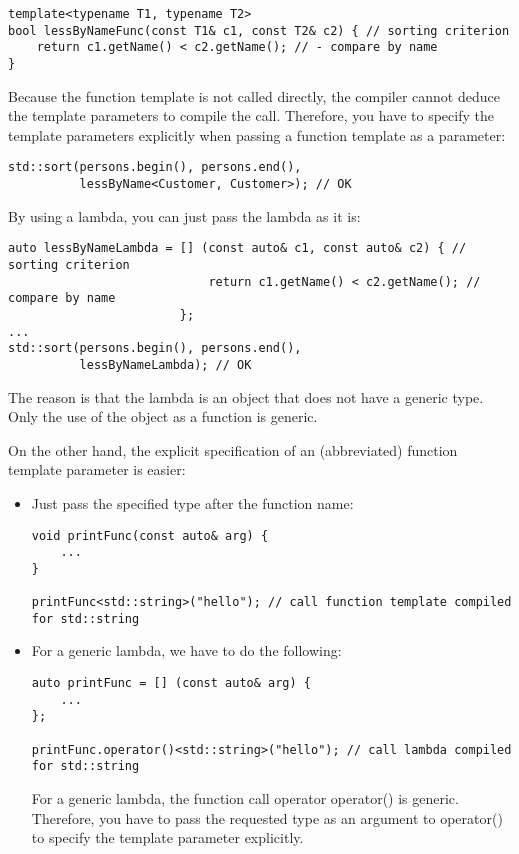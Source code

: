 \begin{lstlisting}[style=styleCXX]
template<typename T1, typename T2>
bool lessByNameFunc(const T1& c1, const T2& c2) { // sorting criterion
	return c1.getName() < c2.getName(); // - compare by name
}
\end{lstlisting}

Because the function template is not called directly, the compiler cannot deduce the template parameters to compile the call. Therefore, you have to specify the template parameters explicitly when passing a function template as a parameter:

\begin{lstlisting}[style=styleCXX]
std::sort(persons.begin(), persons.end(),
		  lessByName<Customer, Customer>); // OK
\end{lstlisting}

By using a lambda, you can just pass the lambda as it is:

\begin{lstlisting}[style=styleCXX]
auto lessByNameLambda = [] (const auto& c1, const auto& c2) { // sorting criterion
							return c1.getName() < c2.getName(); // compare by name
						};
...
std::sort(persons.begin(), persons.end(),
		  lessByNameLambda); // OK
\end{lstlisting}

The reason is that the lambda is an object that does not have a generic type. Only the use of the object as a function is generic.

On the other hand, the explicit specification of an (abbreviated) function template parameter is easier:

\begin{itemize}
\item
Just pass the specified type after the function name:

\begin{lstlisting}[style=styleCXX]
void printFunc(const auto& arg) {
	...
}

printFunc<std::string>("hello"); // call function template compiled for std::string
\end{lstlisting}

\item
For a generic lambda, we have to do the following:

\begin{lstlisting}[style=styleCXX]
auto printFunc = [] (const auto& arg) {
	...
};

printFunc.operator()<std::string>("hello"); // call lambda compiled for std::string
\end{lstlisting}

For a generic lambda, the function call operator operator() is generic. Therefore, you have to pass the requested type as an argument to operator() to specify the template parameter explicitly.
\end{itemize}






